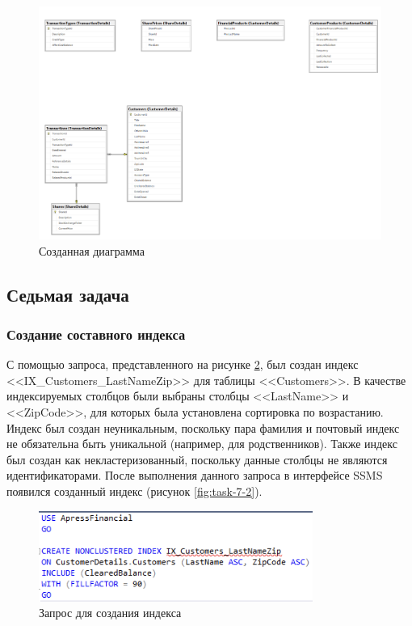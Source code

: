 \documentclass[a4paper, 14pt]{extarticle}
\begin{document}
\begin{figure}[H]
  \centering
  \includegraphics[width=\textwidth]{images/task-6/5.png}
  \caption{Созданная диаграмма}
  \label{fig:task-6-5}
\end{figure}

\subsection{Седьмая задача}

\subsubsection{Создание составного индекса}

С помощью запроса, представленного на рисунке \ref{fig:task-7-1}, был создан
индекс <<\foreignlanguage{english}{IX\_Customers\_LastNameZip}>> для таблицы
<<\foreignlanguage{english}{Customers}>>. В качестве индексируемых столбцов были
выбраны столбцы <<\foreignlanguage{english}{LastName}>> и
<<\foreignlanguage{english}{ZipCode}>>, для которых была установлена сортировка
по возрастанию. Индекс был создан неуникальным, поскольку пара фамилия и
почтовый индекс не обязательна быть уникальной (например, для родственников).
Также индекс был создан как некластеризованный, поскольку данные столбцы не
являются идентификаторами. После выполнения данного запроса в интерфейсе SSMS
появился созданный индекс (рисунок \ref{fig:task-7-2}).

\begin{figure}[H]
  \centering
  \includegraphics[width=0.8\textwidth]{images/task-7/1.png}
  \caption{Запрос для создания индекса}
  \label{fig:task-7-1}
\end{figure}
\end{document}
